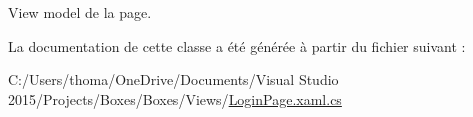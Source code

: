 View model de la page. 



La documentation de cette classe a été générée à partir du fichier suivant \+:\begin{DoxyCompactItemize}
\item 
C\+:/\+Users/thoma/\+One\+Drive/\+Documents/\+Visual Studio 2015/\+Projects/\+Boxes/\+Boxes/\+Views/\hyperlink{_login_page_8xaml_8cs}{Login\+Page.\+xaml.\+cs}\end{DoxyCompactItemize}
